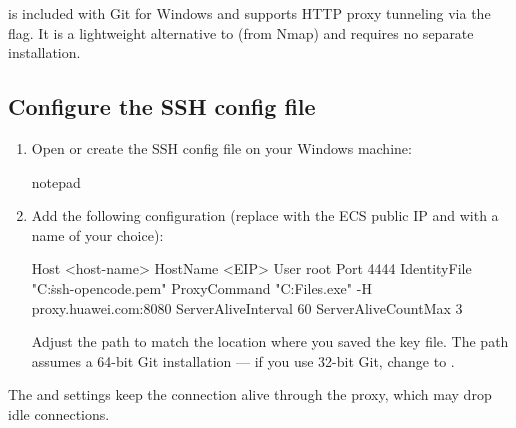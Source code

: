 \documentclass{guide}
\begin{document}
\begin{infobox}
 is included with Git for Windows and supports HTTP
proxy tunneling via the  flag. It is a lightweight alternative to
 (from Nmap) and requires no separate installation.
\end{infobox}

\subsection{Configure the SSH config file}


\stepbystep
\begin{enumerate}
  \item Open or create the SSH config file on your Windows machine:

  \begin{code}
notepad %
  \end{code}

  \item Add the following configuration (replace  with the
        ECS public IP and  with a name of your choice):

  \begin{code}
Host <host-name>
    HostName <EIP>
    User root
    Port 4444
    IdentityFile "C:\Users\user\.ssh\KeyPair-opencode.pem"
    ProxyCommand "C:\Program Files\Git{}\bin\connect.exe" -H proxy.huawei.com:8080 %
    ServerAliveInterval 60
    ServerAliveCountMax 3
  \end{code}

  \begin{infobox}
  Adjust the  path to match the location where you saved
  the  key file. The  path assumes a 64-bit Git
  installation --- if you use 32-bit Git, change  to
  .
  \end{infobox}
\end{enumerate}

\begin{tip}
The  and  settings keep
the connection alive through the proxy, which may drop idle connections.
\end{tip}
\end{document}
